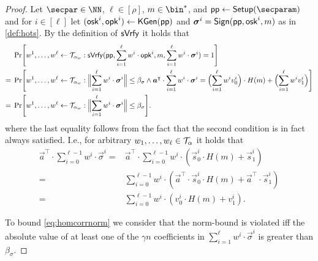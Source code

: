 \begin{proof}
  Let $\secpar\in\NN$, $\ell\in[\rho]$, $m\in\bin^*$, and $\params\gets\setup(\secparam)$ and for $i\in[\ell]$ let $(\mathsf{osk}^i,\mathsf{opk}^i) \gets \mathsf{KGen}(\mathsf{pp})$ and $\boldsymbol{\sigma}^i = \mathsf{Sign}(\mathsf{pp},\mathsf{osk}^i,m)$ as in \autoref{def:hots}. By the definition of $\mathsf{sVrfy}$ it holds that
  \begin{align}
    &\Pr\mleft[
      w^1,\dots,w^\ell\gets \tern_{\alpha_w}
      :
      \sverify(\params,\sum_{i=1}^{\ell}w^i\cdot\opk^i,m,\sum_{i=1}^{\ell}w^i\cdot\vec{\sigma}^i) = 1
    \mright]\nonumber\\
    ={}&\Pr\mleft[
      w^1,\dots,w^\ell\gets \tern_{\alpha_w}
      :
      \Bigl\Vert\sum_{i=1}^{\ell} w^i\cdot\vec{\sigma}^i\Bigr\Vert \leq \beta_\sigma
      \land \vec{a}^\intercal \cdot \sum_{i=1}^{\ell}w^i\cdot\vec{\sigma}^i = \Bigl(\sum_{i=1}^{\ell}w^iv^i_0\Bigr)\cdot H(m) + \Bigl(\sum_{i=1}^{\ell}w^iv^i_1\Bigr)
    \mright]\nonumber\\
    ={}&\Pr\mleft[
      w^1,\dots,w^\ell\gets \tern_{\alpha_w}
      :
      \Bigl\Vert\sum_{i=1}^{\ell} w^i\cdot\vec{\sigma}^i\Bigr\Vert \leq \beta_\sigma\mright].\label{eq:homcorrnorm}
  \end{align}
  where the last equality follows from the fact that the second condition is in fact always satisfied. I.e., for arbitrary $w_1,\dots,w_\ell \in \mathcal{T}_\alpha$ it holds that
  \begin{align*}
    \vec{a}^\intercal\cdot \sum_{i=0}^{\ell-1}w^i\cdot\vec{\sigma}^i
    ={}&\vec{a}^\intercal\cdot \sum_{i=0}^{\ell-1}w^i\cdot(\vec{s}_0^i\cdot H(m)+\vec{s}_1^i)\tag{Def of $\sign$}\\
    ={}&\sum_{i=0}^{\ell-1}w^i\cdot(\vec{a}^\intercal\cdot\vec{s}_0^i\cdot H(m)+\vec{a}^\intercal\cdot\vec{s}_1^i)\tag{Distributivity}\\
    ={}&\sum_{i=0}^{\ell-1}w^i\cdot(v_0^i\cdot H(m)+v_1^i)\tag{Def of $\kgen$}.
  \end{align*}

  To bound \autoref{eq:homcorrnorm} we consider that the norm-bound is violated iff the absolute value of at least one of the $\gamma n$ coefficients in $\sum_{i=1}^{\ell} w^i\cdot\vec{\sigma}^i$ is greater than $\beta_\sigma$.
  

\end{proof}
